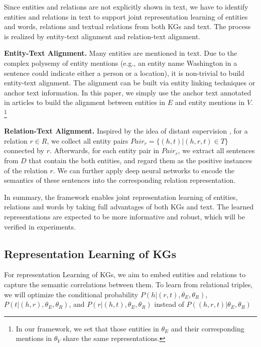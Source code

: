 \documentclass[11pt,a4paper]{article}
\begin{document}
Since entities and relations are not explicitly shown in text, we have to identify entities and relations in text to support joint representation learning of entities and words, relations and textual relations from both KGs and text. The process is realized by entity-text alignment and relation-text alignment.

\textbf{Entity-Text Alignment.} Many entities are mentioned in text. Due to the complex polysemy of entity mentions (e.g., an entity name Washington in a sentence could indicate either a person or a location), it is non-trivial to build entity-text alignment. The alignment can be built via entity linking techniques or anchor text information. In this paper, we simply use the anchor text annotated in articles to build the alignment between entities in $E$ and entity mentions in $V$. \footnote{In our framework, we set that those entities in $\theta_E$ and their corresponding mentions in $\theta_V$ share the same representations.}


\textbf{Relation-Text Alignment.} Inspired by the idea of distant supervision \cite{min2013distant}, for a relation $r \in R$, we collect all entity pairs $Pair_{r} = \{(h, t) | (h, r, t) \in T \}$ connected by $r$. Afterwards, for each entity pair in $Pair_{r}$, we extract all sentences from $D$ that contain the both entities, and regard them as the positive instances of the relation $r$. We can further apply deep neural networks to encode the semantics of these sentences into the corresponding relation representation.

In summary, the framework enables joint representation learning of entities, relations and words by taking full advantages of both KGs and text. The learned representations are expected to be more informative and robust, which will be verified in experiments.

\subsection{Representation Learning of KGs}
\label{sec:kg}
For representation Learning of KGs, we aim to embed entities and relations to capture the semantic correlations between them. To learn from relational triples, we will optimize the conditional probability $P(h|(r, t),{\theta_E, \theta_R})$, $P(t|(h, r),{\theta_E, \theta_R})$, and $P(r|(h, t),{\theta_E, \theta_R})$ instead of $P((h, r, t)|{\theta_E, \theta_R})$
\end{document}
